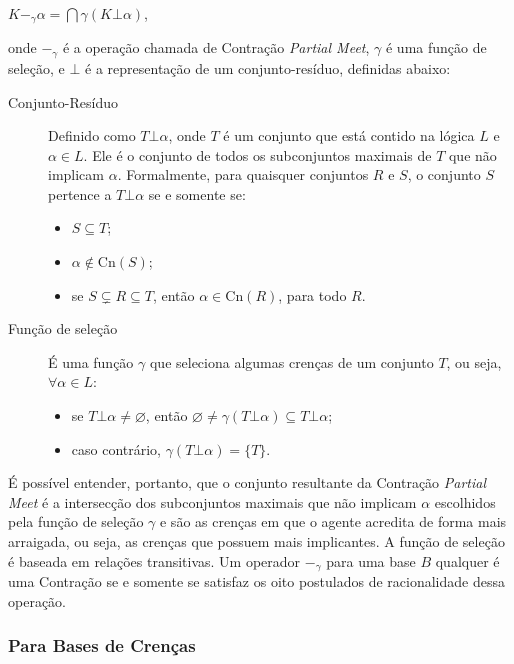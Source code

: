 \begin{center}
	$ K -_{\gamma} \alpha = \bigcap \gamma(K \bot \alpha) $,
\end{center}

onde $ -_{\gamma} $ é a operação chamada de Contração \textit{Partial Meet}, $ \gamma $ é uma função de seleção, e $ \bot $ é a representação de um conjunto-resíduo, definidas abaixo:

\begin{description}
	\item[Conjunto-Resíduo] Definido como $ T \bot \alpha $, onde $ T $ é um conjunto que está contido na lógica $ L $ e $ \alpha \in L $. Ele é o conjunto de todos os subconjuntos maximais de $ T $ que não implicam $ \alpha $. Formalmente, para quaisquer conjuntos $ R $ e $ S $, o conjunto $ S $ pertence a $ T \bot \alpha $ se e somente se:
	\begin{itemize}
		\item $ S \subseteq T $;
		\item $ \alpha \notin \text{Cn}(S) $;
		\item se $ S \subsetneq R \subseteq T $, então $ \alpha \in \text{Cn}(R)$, para todo $R$.
	\end{itemize}
	\item[Função de seleção] É uma função $ \gamma $ que seleciona algumas crenças de um conjunto $ T $, ou seja, $ \forall \alpha \in L $:
	\begin{itemize}
		\item se $ T \bot \alpha \neq \varnothing $, então $ \varnothing \neq \gamma(T \bot \alpha) \subseteq T \bot \alpha $;
		\item caso contrário, $ \gamma(T \bot \alpha) = \{T\} $.
	\end{itemize}
\end{description}

É possível entender, portanto, que o conjunto resultante da Contração \textit{Partial Meet} é a intersecção dos subconjuntos maximais que não implicam $ \alpha $ escolhidos pela função de seleção $ \gamma $ e são as crenças em que o agente acredita de forma mais arraigada, ou seja, as crenças que possuem mais implicantes. A função de seleção é baseada em relações transitivas. Um operador $ -_{\gamma} $ para uma base $ B $ qualquer é uma Contração se e somente se satisfaz os oito postulados de racionalidade dessa operação.

\subsubsection{Para Bases de Crenças}

